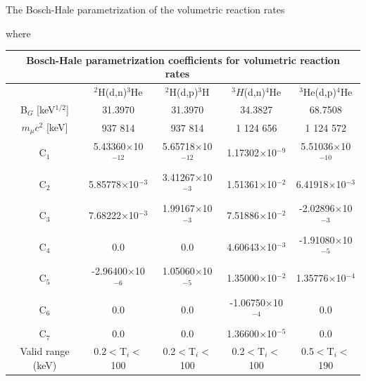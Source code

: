 \noindent
The Bosch-Hale parametrization of the volumetric reaction rates~~\cite{bosch}

\indent
where

\begin{table}[h!]\small
  \noindent
  \centering
  \begin{tabular}{c c c c c}
    \multicolumn{5}{c}{Bosch-Hale parametrization coefficients for volumetric reaction rates~~\cite{bosch}}\\
    \hline
    \T\B& $^2$H(d,n)$^3$He & $^2$H(d,p)$^3$H & $^3H$(d,n)$^4$He & $^3$He(d,p)$^4$He\\
    \hline\hline
    B$_G$ [keV$^{1/2}$] \T& 31.3970 & 31.3970 & 34.3827   & 68.7508 \\
    $m_\mu c^2$ [keV]   \B& 937 814 & 937 814 & 1 124 656 & 1 124 572 \\
    \hline
    C$_1$\T& 5.43360$\times$10$^{-12}$  & 5.65718$\times$10$^{-12}$ & 1.17302$\times$10$^{-9}$  & 5.51036$\times$10$^{-10}$ \\ 
    C$_2$  & 5.85778$\times$10$^{-3}$   & 3.41267$\times$10$^{-3}$  & 1.51361$\times$10$^{-2}$  & 6.41918$\times$10$^{-3}$ \\
    C$_3$  & 7.68222$\times$10$^{-3}$   & 1.99167$\times$10$^{-3}$  & 7.51886$\times$10$^{-2}$  & -2.02896$\times$10$^{-3}$ \\
    C$_4$  & 0.0                        & 0.0                       & 4.60643$\times$10$^{-3}$  & -1.91080$\times$10$^{-5}$ \\
    C$_5$  & -2.96400$\times$10$^{-6}$  & 1.05060$\times$10$^{-5}$  & 1.35000$\times$10$^{-2}$  & 1.35776$\times$10$^{-4}$ \\
    C$_6$  & 0.0                        & 0.0                       & -1.06750$\times$10$^{-4}$ & 0.0 \\
    C$_7$\B& 0.0                      & 0.0                       & 1.36600$\times$10$^{-5}$  & 0.0 \\
    \hline
    Valid range (keV) \T\B& 0.2$<$T$_i<$100 & 0.2$<$T$_i<$100 & 0.2$<$T$_i<$100 & 0.5$<$T$_i<$190\\
    \hline
  \end{tabular}
  \label{table:rrParam}
\end{table}

